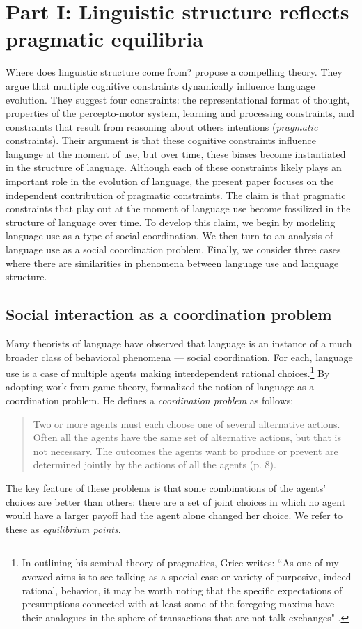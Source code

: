 \documentclass[man, noapacite, 12pt]{apa2}
\begin{document}
\section{Part I: Linguistic structure reflects pragmatic equilibria}

Where does linguistic structure come from?  propose a compelling theory. They argue that  multiple cognitive constraints dynamically influence language evolution. They suggest four constraints: the representational format of thought, properties of the percepto-motor system, learning and processing constraints, and constraints that result from reasoning about others intentions ({\it pragmatic} constraints). Their argument is that these  cognitive constraints  influence  language at the moment of use, but over time, these biases become instantiated in the structure of language. Although each of these constraints likely plays an important role in the evolution of language, the present paper focuses on the independent contribution of pragmatic constraints. The claim is that pragmatic constraints that play out at the moment of language use become fossilized in the structure of language over time. To develop this claim, we begin by modeling language use as a type of social coordination. We then turn to an analysis of language use as a social coordination problem. Finally, we consider three cases where there are similarities in phenomena between language use and language structure.

\subsection{Social interaction as a coordination problem}
Many theorists of language \cite{zipf1936, lewis1969convention, grice1975logic, clark1996using} have observed that language is an instance of a much broader class of behavioral phenomena --- social coordination. For each, language use is a case of multiple agents making interdependent  rational choices.\footnote{In outlining his seminal theory of pragmatics, Grice  writes: ``As one of my avowed aims is to see talking as a special case or variety of purposive, indeed rational, behavior, it may be worth noting that the specific expectations of presumptions connected with at least some of the foregoing maxims have their analogues in the sphere of transactions that are not talk exchanges" \cite[pg. 47]{grice1975logic}.} By adopting work from game theory,   formalized the notion of language as a coordination problem. He defines a  {\it coordination problem} as follows: \begin{quote} Two or more agents must each choose one of several alternative actions. Often all the agents have the same set of alternative actions, but that is not necessary. The outcomes the agents want to produce or prevent are determined jointly by the actions of all the agents (p. 8).
\end{quote} 
The key feature of these problems is that some combinations of the agents' choices are better than others: there are a set of joint choices in which no agent would have a larger payoff had the agent alone changed her choice. We refer to these as {\it equilibrium points}. 
\end{document}
